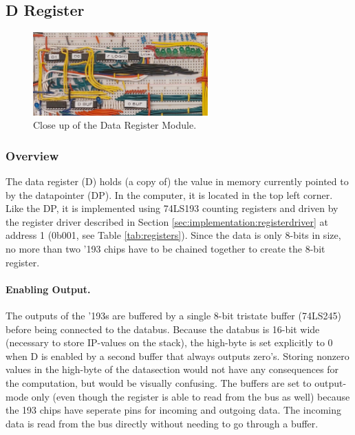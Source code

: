 
\subsection{D Register}
\begin{figure}[H]
  \centering
  \includegraphics[width=0.6\textwidth]{img/dregistercloseup}
  \caption{Close up of the Data Register Module.}
  \label{fig:dregcloseup}
\end{figure}

\subsubsection{Overview}
The data register (D) holds (a copy of) the value in memory currently pointed to by the datapointer (DP). In the computer, it is located in the top left corner. Like the DP, it is implemented using 74LS193 counting registers and driven by the register driver described in Section \ref{sec:implementation:registerdriver} at address 1 (0b001, see Table \ref{tab:registers}). Since the data is only 8-bits in size, no more than two '193 chips have to be chained together to create the 8-bit register. 

\paragraph{Enabling Output. } The outputs of the '193s are buffered by a single 8-bit tristate buffer (74LS245) before being connected to the databus. Because the databus is 16-bit wide (necessary to store IP-values on the stack), the high-byte is set explicitly to 0 when D is enabled by a second buffer that always outputs zero's. Storing nonzero values in the high-byte of the datasection would not have any consequences for the computation, but would be visually confusing. The buffers are set to output-mode only (even though the register is able to read from the bus as well) because the 193 chips have seperate pins for incoming and outgoing data. The incoming data is read from the bus directly without needing to go through a buffer.

